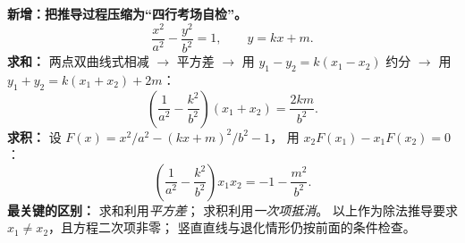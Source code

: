 \begin{summarybox}
\textbf{新增：把推导过程压缩为“四行考场自检”。}
\[
 \frac{x^2}{a^2}-\frac{y^2}{b^2}=1,\qquad y=kx+m.
\]
\textbf{求和：} 两点双曲线式相减 $\to$ 平方差
$\to$ 用 $y_1-y_2=k(x_1-x_2)$ 约分
$\to$ 用 $y_1+y_2=k(x_1+x_2)+2m$：
\[
 \boxed{\left(\frac1{a^2}-\frac{k^2}{b^2}\right)(x_1+x_2)
 =\frac{2km}{b^2}}.
\]
\textbf{求积：} 设 $F(x)=x^2/a^2-(kx+m)^2/b^2-1$，
用 $x_2F(x_1)-x_1F(x_2)=0$：
\[
 \boxed{\left(\frac1{a^2}-\frac{k^2}{b^2}\right)x_1x_2
 =-1-\frac{m^2}{b^2}}.
\]
\textbf{最关键的区别：} 求和利用\emph{平方差}；
求积利用\emph{一次项抵消}。
以上作为除法推导要求 $x_1\ne x_2$，且方程二次项非零；
竖直直线与退化情形仍按前面的条件检查。
\end{summarybox}
